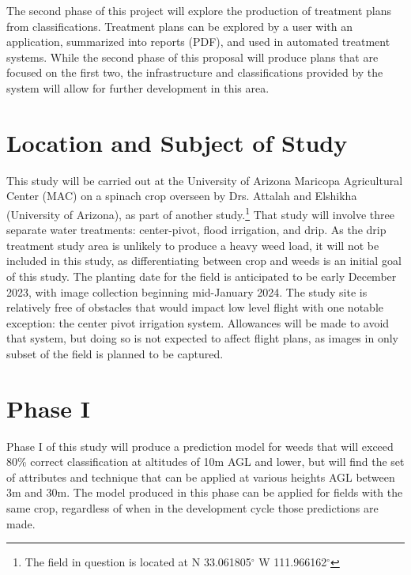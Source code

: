 \documentclass[12pt]{article}
\begin{document}
 The second phase of this project will explore the production of treatment plans from classifications. Treatment plans can be explored by a user with an application, summarized into reports (PDF), and used in automated treatment systems.  While the second phase of this proposal will  produce plans that are focused on the first two, the infrastructure and classifications provided by the system will allow for further development in this area.

\section{Location and Subject of Study}
This study will be carried out at the University of Arizona Maricopa Agricultural Center (MAC) on a spinach crop overseen by Drs. Attalah and Elshikha (University of Arizona), as part of another study.\footnote{The field in question is located at N 33.061805$^{\circ}$ W 111.966162$^{\circ}$} That study will involve three separate water treatments: center-pivot, flood irrigation, and drip. As the drip treatment study area is unlikely to produce a heavy weed load, it will not be included in this study, as differentiating between crop and weeds is an initial goal of this study. The planting date for the field is anticipated to be early December 2023, with image collection beginning mid-January 2024. The study site is relatively free of obstacles that would impact low level flight with one notable exception: the center pivot irrigation system. Allowances will be made to avoid that system, but doing so is not expected to affect flight plans, as images in only subset of the field is planned to be captured.
 
\section{Phase I}
Phase I of this study will produce a prediction model for weeds that will exceed 80\% correct classification at altitudes of 10m AGL and lower, but will find the set of attributes and technique that can be applied at various heights AGL between 3m and 30m. The model produced in this phase can be applied for fields with the same crop, regardless of when in the development cycle those predictions are made. 
\end{document}
